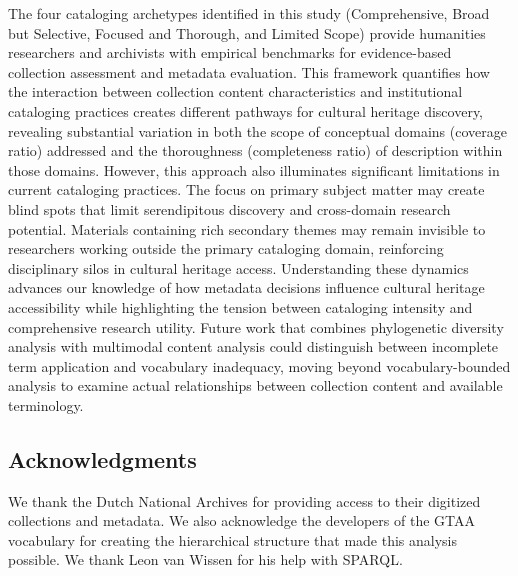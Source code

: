 \documentclass[final]{anthology-ch}
\begin{document}
\noindent The four cataloging archetypes identified in this study (Comprehensive, Broad but Selective, Focused and Thorough, and Limited Scope) provide humanities researchers and archivists with empirical benchmarks for evidence-based collection assessment and metadata evaluation. This framework quantifies how the interaction between collection content characteristics and institutional cataloging practices creates different pathways for cultural heritage discovery, revealing substantial variation in both the scope of conceptual domains (coverage ratio) addressed and the thoroughness (completeness ratio) of description within those domains.
However, this approach also illuminates significant limitations in current cataloging practices. The focus on primary subject matter may create blind spots that limit serendipitous discovery and cross-domain research potential. Materials containing rich secondary themes may remain invisible to researchers working outside the primary cataloging domain, reinforcing disciplinary silos in cultural heritage access.
Understanding these dynamics advances our knowledge of how metadata decisions influence cultural heritage accessibility while highlighting the tension between cataloging intensity and comprehensive research utility. Future work that combines phylogenetic diversity analysis with multimodal content analysis could distinguish between incomplete term application and vocabulary inadequacy, moving beyond vocabulary-bounded analysis to examine actual relationships between collection content and available terminology. 


\subsection{Acknowledgments}

We thank the Dutch National Archives for providing access to their digitized collections and metadata. We also acknowledge the developers of the GTAA vocabulary for creating the hierarchical structure that made this analysis possible. We thank Leon van Wissen for his help with SPARQL.

\printbibliography
\end{document}
